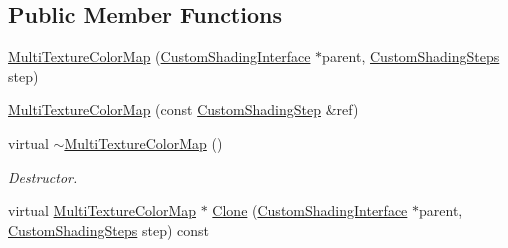 \subsection*{Public Member Functions}
\begin{DoxyCompactItemize}
\item 
\mbox{\hyperlink{class_geometry_engine_1_1_custom_shading_1_1_multi_texture_color_map_a3865507428ef4499c957b71ce011ed3e}{Multi\+Texture\+Color\+Map}} (\mbox{\hyperlink{class_geometry_engine_1_1_custom_shading_1_1_custom_shading_interface}{Custom\+Shading\+Interface}} $\ast$parent, \mbox{\hyperlink{namespace_geometry_engine_1_1_custom_shading_a2dc236a5b567da5099069ce2b2be5609}{Custom\+Shading\+Steps}} step)
\item 
\mbox{\hyperlink{class_geometry_engine_1_1_custom_shading_1_1_multi_texture_color_map_a76266fac65587fdc190620ae7c17e32b}{Multi\+Texture\+Color\+Map}} (const \mbox{\hyperlink{class_geometry_engine_1_1_custom_shading_1_1_custom_shading_step}{Custom\+Shading\+Step}} \&ref)
\item 
\mbox{\label{class_geometry_engine_1_1_custom_shading_1_1_multi_texture_color_map_a91f51b1a5eced28f4b7bbbec79316087}} 
virtual \mbox{\hyperlink{class_geometry_engine_1_1_custom_shading_1_1_multi_texture_color_map_a91f51b1a5eced28f4b7bbbec79316087}{$\sim$\+Multi\+Texture\+Color\+Map}} ()
\begin{DoxyCompactList}\small\item\em Destructor. \end{DoxyCompactList}\item 
virtual \mbox{\hyperlink{class_geometry_engine_1_1_custom_shading_1_1_multi_texture_color_map}{Multi\+Texture\+Color\+Map}} $\ast$ \mbox{\hyperlink{class_geometry_engine_1_1_custom_shading_1_1_multi_texture_color_map_a74c244479b1a529cf311fea441c44159}{Clone}} (\mbox{\hyperlink{class_geometry_engine_1_1_custom_shading_1_1_custom_shading_interface}{Custom\+Shading\+Interface}} $\ast$parent, \mbox{\hyperlink{namespace_geometry_engine_1_1_custom_shading_a2dc236a5b567da5099069ce2b2be5609}{Custom\+Shading\+Steps}} step) const
\end{DoxyCompactItemize}
